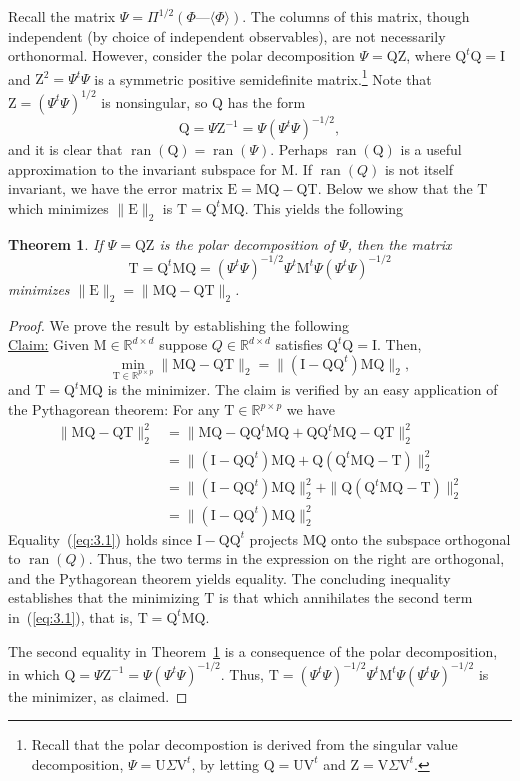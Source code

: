 \documentclass[12pt,letterpaper]{report}
\theoremstyle{plain}
\newtheorem{theorem}{Theorem}[chapter]
\theoremstyle{definition}
\newcounter{claim}
\theoremstyle{remark}
\numberwithin{theorem}{chapter}
\numberwithin{claim}{chapter}
\numberwithin{equation}{chapter}
\numberwithin{conjecture}{chapter}
\newcommand\R{\ensuremath{\mathbb{R}}}
\newcommand\M{\ensuremath{\mathrm{M}}}
\newcommand\T{\ensuremath{\mathrm{T}}}
\newcommand\I{\ensuremath{\mathrm{I}}}
\newcommand\Q{\ensuremath{\mathrm{Q}}}
\newcommand\Z{\ensuremath{\mathrm{Z}}}
\newcommand\E{\ensuremath{\mathrm{E}}}
\newcommand\U{\ensuremath{\mathrm{U}}}
\newcommand\V{\ensuremath{\mathrm{V}}}
\newcommand\ran{\ensuremath{\operatorname{ran}}}
\newcommand\<{\ensuremath{\langle}}
\renewcommand\>{\ensuremath{\rangle}}
\begin{document}
Recall the matrix $\Psi = \Pi^{1/2}(\Phi — \<\Phi\>)$. The columns of this
matrix, though independent (by choice of independent observables), are not
necessarily orthonormal. However, consider the polar decomposition 
$\Psi = \Q \Z$, where $\Q^t\Q = \I$ and $\Z^2 = \Psi^t\Psi$ is a symmetric
positive semidefinite matrix.\footnote{Recall that the polar decompostion is
  derived from the singular value decomposition, $\Psi = \U\Sigma \V^t$, by
  letting $\Q = \U \V^t$ and $\Z = \V\Sigma \V^t$.}
Note that $\Z = (\Psi^t\Psi)^{1/2}$ is nonsingular, so $\Q$ has the form
\[
\Q = \Psi \Z^{-1} = \Psi(\Psi^t\Psi)^{-1/2},
\]
and it is clear that $\ran(\Q) = \ran(\Psi)$. 
Perhaps $\ran(\Q)$ is a useful approximation to the invariant
subspace for $\M$. If $\ran(Q)$ is not itself invariant, we have the error 
matrix $\E =\M\Q - \Q\T$.  Below we show that the
$\T$ which minimizes $\|\E\|_2$ is $\T = \Q^t\M\Q$. 
This yields the following
\begin{theorem}
\label{thm:3.2.2}  
If $\Psi = \Q\Z$ is the polar decomposition of $\Psi$, then the matrix
\[
\T = \Q^t\M\Q = (\Psi^t\Psi)^{-1/2}\Psi^t \M^t \Psi (\Psi^t\Psi)^{-1/2}
\]
minimizes $\|\E\|_2 = \|\M\Q - \Q\T\|_2$.
\end{theorem}
\begin{proof}
We prove the result by establishing the following
\\[6pt]
\underline{Claim:} Given $\M \in \R^{d\times d}$ suppose $Q \in  \R^{d\times d}$
satisfies $\Q^t\Q =\I$. 
Then,
\[
\min_{\T\in \R^{p\times p}} \|\M\Q - \Q\T\|_2 = \|(\I- \Q\Q^t)\M\Q\|_2,
\]
and $\T = \Q^t\M\Q$ is the minimizer.
%
%
%
%
The claim is verified by an easy application of the Pythagorean theorem:
For any $\T \in \R^{p\times p}$ we have
\begin{align}
\label{eq:3.1}
\|\M\Q - \Q\T\|^2_2 &= \|\M\Q - \Q\Q^t\M\Q + \Q\Q^t\M\Q - \Q\T\|^2_2 \nonumber\\
&=\|(\I - \Q\Q^t)\M\Q + \Q(\Q^t\M\Q - \T)\|^2_2 \nonumber \\
&=\|(\I - \Q\Q^t)\M\Q\|^2_2 + \|\Q(\Q^t\M\Q - \T)\|^2_2 \\
&=\|(\I - \Q\Q^t)\M\Q\|^2_2 \nonumber
\end{align}
Equality~(\ref{eq:3.1}) holds since $\I - \Q\Q^t$ projects $\M\Q$ onto the
subspace orthogonal to 
$\ran(Q)$. Thus, the two terms in the expression on the right are orthogonal,
and the Pythagorean theorem yields equality. The concluding inequality
establishes that the minimizing $\T$ is that which annihilates the 
second term in~(\ref{eq:3.1}), that is, $\T = \Q^t\M\Q$.

The second equality in Theorem~\ref{thm:3.2.2} is a consequence of the polar decomposition, in
which $\Q = \Psi \Z^{-1} = \Psi(\Psi^t\Psi)^{-1/2}$. Thus,
$\T = (\Psi^t\Psi)^{-1/2}\Psi^t \M^t \Psi (\Psi^t\Psi)^{-1/2}$
is the minimizer, as claimed.
\end{proof}
\end{document}
